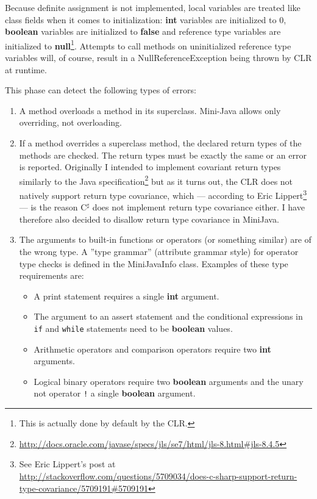 \documentclass[a4paper,11pt]{article}
\begin{document}
Because definite assignment is not implemented, local variables are treated like class fields when it comes to initialization: \textbf{int} variables are initialized to 0, \textbf{boolean} variables are initialized to \textbf{false} and reference type variables are initialized to \textbf{null}\footnote{This is actually done by default by the CLR.}. Attempts to call methods on uninitialized reference type variables will, of course, result in a NullReferenceException being thrown by CLR at runtime.

This phase can detect the following types of errors:
\begin{enumerate}
\item A method overloads a method in its superclass. Mini-Java allows only overriding, not overloading.
\item If a method overrides a superclass method, the declared return types of the methods are checked. The return types must be exactly the same or an error is reported. Originally I intended to implement covariant return types similarly to the Java specification\footnote{\url{http://docs.oracle.com/javase/specs/jls/se7/html/jls-8.html\#jls-8.4.5}} but as it turns out, the CLR does not natively support return type covariance, which --- according to Eric Lippert\footnote{See Eric Lippert's post at \\ \url{http://stackoverflow.com/questions/5709034/does-c-sharp-support-return-type-covariance/5709191\#5709191}} --- is the reason C$^\sharp$ does not implement return type covariance either. I have therefore also decided to disallow return type covariance in MiniJava.
\item The arguments to built-in functions or operators (or something similar) are of the wrong type. A ''type grammar'' (attribute grammar style) for operator type checks is defined in the MiniJavaInfo class. Examples of these type requirements are:
\begin{itemize}
\item A print statement requires a single \textbf{int} argument.
\item The argument to an assert statement and the conditional expressions in \verb,if, and \verb,while, statements need to be \textbf{boolean} values.
\item Arithmetic operators and comparison operators require two \textbf{int} arguments.
\item Logical binary operators require two \textbf{boolean} arguments and the unary not operator \verb,!, a single \textbf{boolean} argument.

\end{itemize}
\end{enumerate}
\end{document}
